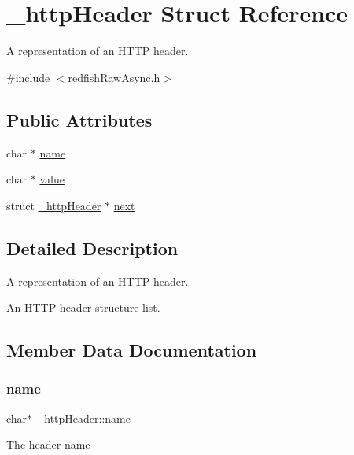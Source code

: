 \hypertarget{struct__httpHeader}{}\section{\+\_\+http\+Header Struct Reference}
\label{struct__httpHeader}


A representation of an H\+T\+TP header.  




{\ttfamily \#include $<$redfish\+Raw\+Async.\+h$>$}

\subsection*{Public Attributes}
\begin{DoxyCompactItemize}
\item 
char $\ast$ \hyperlink{struct__httpHeader_abc7ea1bc0872e4cadac33208bb2b5f83}{name}
\item 
char $\ast$ \hyperlink{struct__httpHeader_aec035a6f64fa780f85bfedbf4f21cf2e}{value}
\item 
struct \hyperlink{struct__httpHeader}{\+\_\+http\+Header} $\ast$ \hyperlink{struct__httpHeader_a84e14f00dee4bf6dbc7b4a52b28fb871}{next}
\end{DoxyCompactItemize}


\subsection{Detailed Description}
A representation of an H\+T\+TP header. 

An H\+T\+TP header structure list. 

\subsection{Member Data Documentation}
\mbox{\label{struct__httpHeader_abc7ea1bc0872e4cadac33208bb2b5f83}} 
\subsubsection{\texorpdfstring{name}{name}}
{\footnotesize\ttfamily char$\ast$ \+\_\+http\+Header\+::name}

The header name \mbox{\label{struct__httpHeader_a84e14f00dee4bf6dbc7b4a52b28fb871}} 
